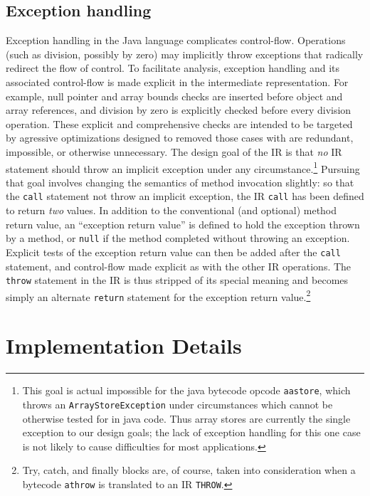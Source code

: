 \documentclass[11pt,notitlepage,twocolumn,twoside]{article}
\begin{document}
\subsection{Exception handling}
Exception handling in the Java language complicates control-flow.
Operations (such as division, possibly by zero) may implicitly throw
exceptions that radically redirect the flow of control.  To facilitate
analysis, exception handling and its associated control-flow is made
explicit in the intermediate representation.  For example, null
pointer and array bounds checks are inserted before object and array
references, and division by zero is explicitly checked before every
division operation.  These explicit and comprehensive checks are
intended to be targeted by agressive optimizations designed to
removed those cases with are redundant, impossible, or otherwise
unnecessary.  The design goal of the IR is that \textit{no} IR
statement should throw an implicit exception under any 
circumstance.\footnote{This goal is actual impossible for the java
bytecode opcode \texttt{aastore}, which throws an
\texttt{ArrayStoreException} under circumstances which cannot be
otherwise tested for in java code.  Thus array stores are
currently the single exception to our design goals; the lack of exception
handling for this one case is not likely to cause difficulties for most
applications.}  Pursuing that goal involves changing the semantics of method
invocation slightly: so that the \texttt{call} statement not throw an
implicit exception, the IR \texttt{call} has been defined to return
\textit{two} values.  In addition to the conventional (and optional)
method return value, an ``exception return value'' is defined to hold
the exception thrown by a method, or \texttt{null} if the method
completed without throwing an exception.  Explicit tests of the
exception return value can then be added after the \texttt{call}
statement, and control-flow made explicit as with the other IR
operations.  The \texttt{throw} statement in the IR is thus stripped
of its special meaning and becomes simply an alternate \texttt{return}
statement for the exception return value.\footnote{Try, catch, and
finally blocks are, of course, taken into consideration when a
bytecode \texttt{athrow} is translated to an IR \texttt{THROW}.}

\section{Implementation Details}
\end{document}
